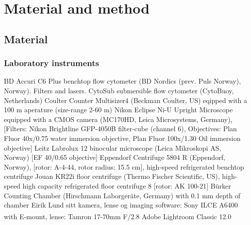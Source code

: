 \chapter{Material and method}
\label{chap:m&m}

\section{Material}

\subsection{Laboratory instruments}
BD Accuri C6 Plus benchtop flow cytometer (BD Nordics (prev. Puls Norway), Norway). Filters and lasers.
CytoSub submersible flow cytometer (CytoBuoy, Netherlands)
Coulter Counter Multisizer4 (Beckman Coulter, US) eqipped with a 100 \micro m aperature (size-range 2-60 \micro m)
Nikon Eclipse Ni-U Upright Microscope equipped with a CMOS camera (MC170HD, Leica Microsystems, Germany), [Filters: Nikon Brightline GFP-4050B filter-cube (channel 6), Objectives: Plan Fluor 40x/0.75 water immersion objective, Plan Fluor 100x/1.30 Oil immersion objective]
Leitz Labrolux 12 binocular microscope (Leica Mikroskopi AS, Norway) [EF 40/0.65 objective]
Eppendorf Centrifuge 5804 R (Eppendorf, Norway), [rotor: A-4-44, rotor radius: 15.5 cm], high-speed refrigerated benchtop centrifuge
Jouan KR22i floor centrifuge (Thermo Fischer Scientific, US), high-speed high capacity refrigerated floor centrifuge 8 [rotor: AK 100-21]
Bürker Counting Chamber (Hirschmann Laborgeräte, Germany) with 0.1 mm depth of chamber
Eirik Lund sitt kamera, lense og imaging software: 
Sony ILCE A6400 with E-mount, lense: Tamron 17-70mm F/2.8 
Adobe\textsuperscript{\textregistered} Lightroom Classic 12.0 

